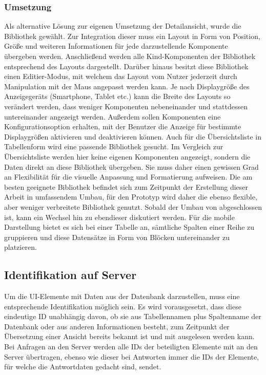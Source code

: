 \subsubsection{Umsetzung}\label{subsec:layout}
Als alternative Lösung zur eigenen Umsetzung der Detailansicht, wurde die Bibliothek  gewählt. Zur Integration dieser muss ein Layout in Form von Position, Größe und weiteren Informationen für jede darzustellende Komponente übergeben werden. Anschließend werden alle Kind-Komponenten der Bibliothek entsprechend des Layouts dargestellt. Darüber hinaus besitzt diese Bibliothek einen Editier-Modus, mit welchem das Layout vom Nutzer jederzeit durch Manipulation mit der Maus angepasst werden kann. Je nach Displaygröße des Anzeigegeräts (Smartphone, Tablet etc.) kann die Breite des Layouts so verändert werden, dass weniger Komponenten nebeneinander und stattdessen untereinander angezeigt werden. Außerdem sollen Komponenten eine Konfigurationsoption erhalten, mit der Benutzer die Anzeige für bestimmte Displaygrößen aktivieren und deaktivieren können.
Auch für die Übersichtsliste in Tabellenform wird eine passende Bibliothek gesucht. Im Vergleich zur Übersichtsliste werden hier keine eigenen Komponenten angezeigt, sondern die Daten direkt an diese Bibliothek übergeben. Sie muss daher einen gewissen Grad an Flexibilität für die visuelle Anpassung und Formatierung aufweisen. Die am besten geeignete Bibliothek  befindet sich zum Zeitpunkt der Erstellung dieser Arbeit in umfassendem Umbau, für den Prototyp wird daher die ebenso flexible, aber weniger verbreitete Bibliothek  genutzt. Sobald der Umbau von  abgeschlossen ist, kann ein Wechsel hin zu ebendieser diskutiert werden. Für die mobile Darstellung bietet es sich bei einer Tabelle an, sämtliche Spalten einer Reihe zu gruppieren und diese Datensätze in Form von Blöcken untereinander zu platzieren.

\subsection{Identifikation auf Server}
Um die UI-Elemente mit Daten aus der Datenbank darzustellen, muss eine entsprechende Identifikation möglich sein. Es wird vorausgesetzt, dass diese eindeutige ID unabhängig davon, ob sie aus Tabellennamen plus Spaltenname der Datenbank oder aus anderen Informationen besteht, zum Zeitpunkt der Übersetzung einer Ansicht bereits bekannt ist und mit ausgelesen werden kann. Bei Anfragen an den Server werden alle IDs der beteiligten Elemente mit an den Server übertragen, ebenso wie dieser bei Antworten immer die IDs der Elemente, für welche die Antwortdaten gedacht sind, sendet.

